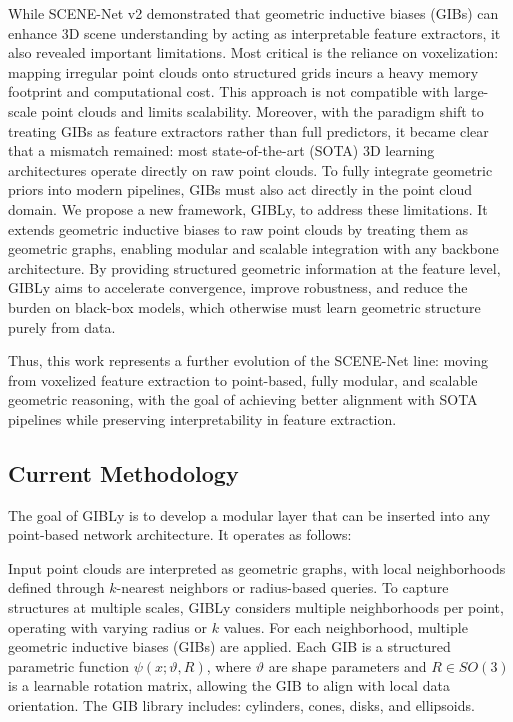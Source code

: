 While SCENE-Net v2 demonstrated that geometric inductive biases (GIBs) can
enhance 3D scene understanding by acting as interpretable feature extractors,
it also revealed important limitations. Most critical is the reliance on
voxelization: mapping irregular point clouds onto structured grids incurs a
heavy memory footprint and computational cost. This approach is not compatible
with large-scale point clouds and limits scalability.
%
Moreover, with the paradigm shift to treating GIBs as feature extractors rather
than full predictors, it became clear that a mismatch remained: most
state-of-the-art (SOTA) 3D learning architectures operate directly on raw point
clouds. To fully integrate geometric priors into modern pipelines, GIBs must
also act directly in the point cloud domain.
%
We propose a new framework, GIBLy, to address these limitations. It extends
geometric inductive biases to raw point clouds by treating them as geometric
graphs, enabling modular and scalable integration with any backbone
architecture. By providing structured geometric information at the feature
level, GIBLy aims to accelerate convergence, improve robustness, and reduce the
burden on black-box models, which otherwise must learn geometric structure
purely from data.

Thus, this work represents a further evolution of the SCENE-Net line: moving
from voxelized feature extraction to point-based, fully modular, and scalable
geometric reasoning, with the goal of achieving better alignment with SOTA
pipelines while preserving interpretability in feature extraction.

\subsection{Current Methodology}

The goal of GIBLy is to develop a modular layer that can be inserted into
any point-based network architecture. It operates as follows:

Input point clouds are interpreted as geometric graphs, with local
neighborhoods defined through $k$-nearest neighbors or radius-based queries. To
capture structures at multiple scales, GIBLy considers multiple
neighborhoods per point, operating with varying radius or $k$ values.
%
For each neighborhood, multiple geometric inductive biases (GIBs) are applied.
Each GIB is a structured parametric function $\psi(x; \vartheta, R)$, where
$\vartheta$ are shape parameters and $R \in SO(3)$ is a learnable rotation
matrix, allowing the GIB to align with local data orientation.
%
The GIB library includes: cylinders, cones, disks, and ellipsoids.

